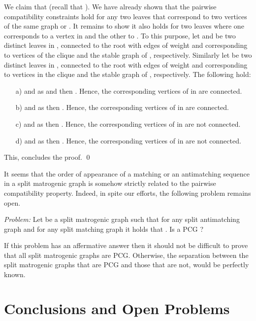 \documentclass[dvipdfm]{llncs}
\begin{document}
We claim that  (recall that ). We have already shown that the pairwise compatibility constraints hold for any two leaves that correspond to two vertices of the same graph  or  . It remains to show it also holds for two leaves  where one corresponds to a vertex in  and the other to . To this purpose, let  and  be two distinct leaves in , connected to the root with edges of weight  and  corresponding to vertices of the clique and the stable graph of , respectively. Similarly let  be two distinct leaves in , connected to the root with edges of weight  and corresponding to vertices in the clique and the stable graph of , respectively. The following hold:

\begin{itemize}
\item[a)]  and as  and  then . Hence, the corresponding vertices of  in  are connected.
\item[b)]  and as  then .  Hence, the corresponding vertices of  in  are connected.
\item[c)]  and as  then . Hence, the corresponding vertices of  in  are not connected.
\item[d)]  and as  then . Hence, the corresponding vertices of  in  are not connected.
\end{itemize}

This, concludes the proof. \qed




It seems that the order of appearance of a matching or an antimatching sequence in a split matrogenic graph is somehow strictly related to the pairwise compatibility property.  Indeed, in spite our efforts, the following problem remains open.

\textit{Problem:} Let  be a split matrogenic graph such that for any split antimatching graph  and for any split matching graph  it holds  that . Is  a PCG ?

If this problem has an affermative answer then it should not be difficult to prove that all split matrogenic graphs are PCG. Otherwise, the separation between the split matrogenic graphs that are PCG and those that are not, would be perfectly known. 



\section{Conclusions and Open Problems}\label{sec:conclusion}
\end{document}
